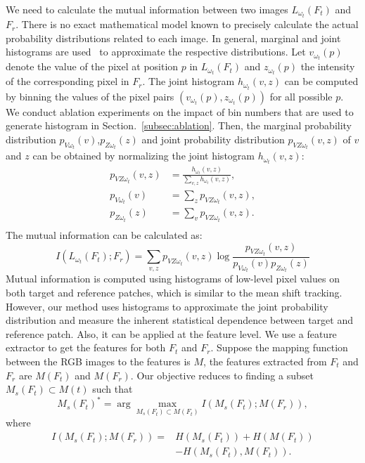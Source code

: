 \documentclass[10pt,twocolumn,letterpaper]{article}
\begin{document}
{ We need to calculate the mutual information between two images $L_{\omega_t}(F_t)$ and $F_r$. There is no exact mathematical model known to precisely calculate the actual probability distributions related to each image. In general, marginal and joint histograms are  used~\cite{Viola1995AlignmentBM} to approximate the respective distributions. Let $v_{\omega_t}(p)$ denote the value of the pixel at position $p$ in $L_{\omega_t}(F_t)$ and $z_{\omega_t}(p)$ the intensity of the corresponding pixel in $F_r$. The joint histogram $h_{\omega_t}(v,z)$ can be computed by binning the values of the pixel pairs $(v_{\omega_t}(p),z_{\omega_t}(p))$ for all possible $p$. We conduct ablation experiments on the impact of bin numbers that are used to generate histogram in Section.~\ref{subsec:ablation}. Then, the marginal probability distribution $p_{V \omega_t}(v)$,$p_{Z \omega_t}(z)$ and joint probability distribution $p_{VZ \omega_t}(v,z)$ of $v$ and $z$ can be obtained by normalizing the joint histogram $h_{\omega_t}(v,z)$:
\begin{equation}
\begin{split}
    p_{VZ\omega_t}(v,z) &= \frac{h_{\omega_t}(v,z)}{\sum_{v,z}h_{\omega_t}(v,z)},\\
    p_{V\omega_t}(v) &= \sum_{z} p_{VZ\omega_t}(v,z),\\
    p_{Z\omega_t}(z) &= \sum_{v} p_{VZ\omega_t}(v,z).\\
\end{split}
\label{eq:mi_pd}
\end{equation}
The mutual information can be calculated as:
\begin{equation}
    I(L_{\omega_t}(F_t);F_r)=\sum_{v,z}p_{VZ\omega_t}(v,z)\log\frac{p_{VZ\omega_t}(v,z)}{p_{V\omega_t}(v)p_{Z\omega_t}(z)}
\end{equation}
Mutual information is computed using histograms of low-level pixel values on both target and reference patches, which is similar to the mean shift tracking. However, our method uses histograms to approximate the joint probability distribution and measure the inherent statistical dependence between target and reference patch. Also, it can be applied at the feature level. We use a feature extractor to get the features for both $F_t$ and $F_r$. Suppose the mapping function between the RGB images to the features is $M$, the features extracted from $F_t$ and $F_r$ are $M(F_t)$ and $M(F_r)$. Our objective reduces to finding a subset $M_s(F_t) \subset M(t)$ such that
\begin{equation}
    M_s(F_t)^* = \arg\max_{M_s(F_t)\subset M(F_t)} I(M_s(F_t);M(F_r)),
\end{equation}
where
\begin{equation}
\begin{split}
         I(M_s(F_t);M(F_r)) = &H(M_s(F_t)) + H(M(F_t)) \\
         &- H(M_s(F_t),M(F_t)).
\end{split}
\end{equation}

}
\end{document}
